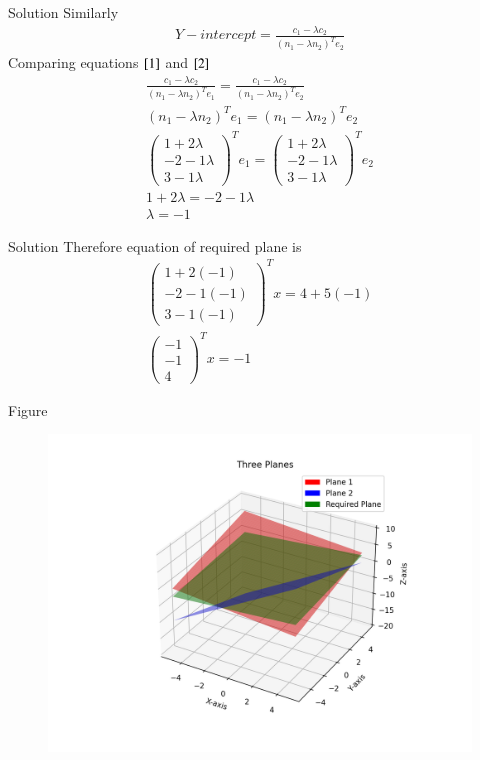 \documentclass{beamer}
\begin{document}
\begin{frame}{Solution}
Similarly
\begin{align}
    Y-intercept=\frac{c_1-\lambda c_2}{(n_1-\lambda n_2)^Te_2} \label{2}
\end{align}
Comparing equations $\eqref{1}$ and $\eqref{2}$
\begin{align}
    \frac{c_1-\lambda c_2}{(n_1-\lambda n_2)^Te_1}=\frac{c_1-\lambda c_2}{(n_1-\lambda n_2)^Te_2}\\
    (n_1-\lambda n_2)^Te_1=(n_1-\lambda n_2)^Te_2\\
    \begin{pmatrix}1+2\lambda\\-2-1\lambda\\3-1\lambda\end{pmatrix}^Te_1=\begin{pmatrix}1+2\lambda\\-2-1\lambda\\3-1\lambda\end{pmatrix}^Te_2\\
    1+2\lambda=-2-1\lambda\\
    \lambda=-1
\end{align}
\end{frame}
\begin{frame}{Solution}
Therefore equation of required plane is
\begin{align}
    \begin{pmatrix}1+2(-1)\\-2-1(-1)\\3-1(-1)\end{pmatrix}^Tx=4+5(-1)\\
    \begin{pmatrix}-1\\-1\\4\end{pmatrix}^Tx=-1
\end{align}
\end{frame}
\begin{frame}{Figure}
    \begin{figure}[H]
    \centering
    \includegraphics[width=0.95\columnwidth]{figs/Figure.png}
    \caption{}
    \label{fig:placeholder}
\end{figure}
\end{frame}
\end{document}
